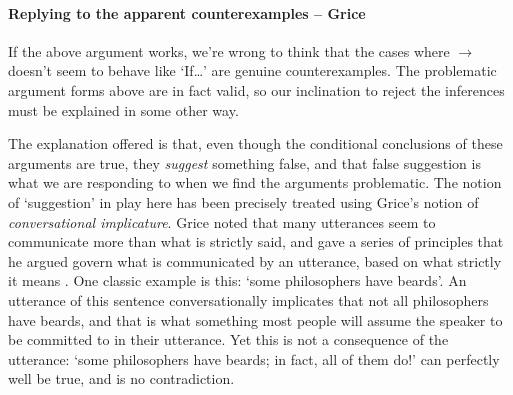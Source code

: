 \paragraph{Replying to the apparent counterexamples – Grice}
If the above argument works, we're wrong to think that the cases where $\to$ doesn't seem to behave like `If…' are genuine counterexamples. The problematic argument forms above are in fact valid, so our inclination to reject the inferences must be explained in some other way.

The explanation offered is that, even though the conditional conclusions of these arguments are true, they \emph{suggest} something false, and that false  suggestion is what we are responding to when we find the arguments problematic. The notion of `suggestion' in play here has been precisely treated using Grice's notion of  \emph{conversational implicature}. Grice noted that many utterances seem to communicate more than what is strictly said, and gave a series of principles that he argued govern what is communicated by an utterance, based on what strictly it means \citep{grilogco}. One classic example is this: `some philosophers have beards'. An utterance of this sentence conversationally implicates that not all philosophers have beards, and that is what something most people will assume the speaker to be committed to in their utterance. Yet this is not a consequence of the utterance: `some philosophers have beards; in fact, all of them do!' can perfectly well be true, and is no contradiction. 

